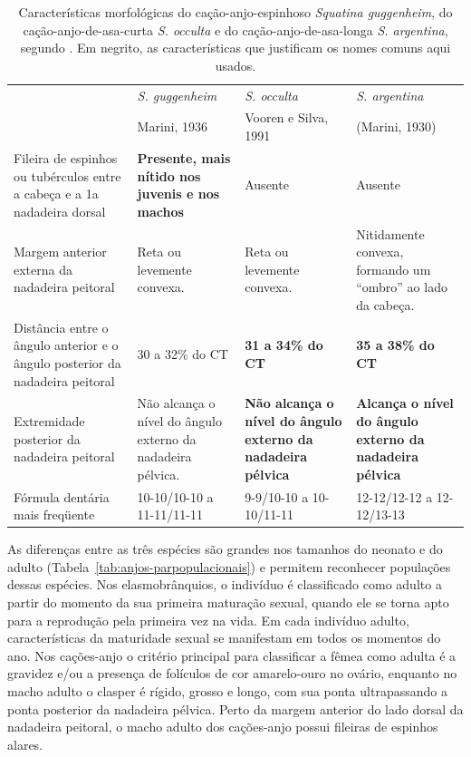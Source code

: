 \documentclass[a4paper,11pt,twoside,showtrims,onecolumn,openright,final]{memoir}
\begin{document}
\begin{table}
\caption[Características morfológicas dos cações-anjo \emph{Squatina guggenheim}, 
	 \emph{S. occulta} e \emph{S. argentina}]
        {Características morfológicas do cação-anjo-espinhoso \emph{Squatina guggenheim}, 
	 do cação-anjo-de-asa-curta \emph{S. occulta} e do 
	 cação-anjo-de-asa-longa \emph{S. argentina}, segundo \citet{vooren1991}. 
	 Em negrito, as características que justificam os nomes comuns aqui usados. }
\label{tab:anjos-morfologia}
\begin{small}
\begin{tabularx}{\textwidth}{XXXX}
\toprule
					& \emph{S. guggenheim} & \emph{S. occulta} & \emph{S. argentina} \\ 
					& Marini, 1936		     & Vooren e Silva, 1991    & (Marini, 1930) \\
\midrule
\addlinespace
Fileira de espinhos ou tubérculos 
entre a cabeça e a 1a nadadeira dorsal
					& \textbf{Presente, mais nítido 
					nos juvenis e nos 
					machos}			& Ausente		& Ausente \\
\midrule
\addlinespace
Margem anterior externa da 
nadadeira peitoral			& Reta ou levemente 
					convexa.		& Reta ou levemente 
								convexa.		& Nitidamente convexa, 
											formando um ``ombro'' 
											ao lado da cabeça.  \\
\midrule
\addlinespace
Distância entre o ângulo anterior 
e o ângulo posterior da 
nadadeira peitoral 			& 30 a 32\% do CT	& \textbf{31 a 34\% do CT}	& \textbf{35 a 38\% do CT} \\
\midrule
\addlinespace
Extremidade posterior da nadadeira 
peitoral				& Não alcança o nível 
					do ângulo externo da 
					nadadeira pélvica.	& \textbf{Não alcança o nível 
								do ângulo externo da 
								nadadeira pélvica}	& \textbf{Alcança o nível do 
											ângulo externo da 
											nadadeira pélvica} \\
\midrule
\addlinespace
Fórmula dentária mais freqüente		& 10-10/10-10 a 
					11-11/11-11		& 9-9/10-10 a 
								10-10/11-11		& 12-12/12-12 a 
											12-12/13-13 \\
\bottomrule
\end{tabularx}
\end{small}
\end{table}


As diferenças entre as três espécies são grandes nos tamanhos do neonato e do adulto (Tabela~\ref{tab:anjos-parpopulacionais}) %
e permitem reconhecer populações dessas espécies. Nos elasmobrânquios, o indivíduo é classificado 
como adulto a partir do momento da sua primeira maturação sexual, quando ele se torna apto para 
a reprodução pela primeira vez na vida. Em cada indivíduo adulto, características da maturidade 
sexual se manifestam em todos os momentos do ano. Nos cações-anjo o critério principal para 
classificar a fêmea como adulta é a gravidez e/ou a presença de folículos de cor amarelo-ouro 
no ovário, enquanto no macho adulto o clasper é rígido, grosso e longo, com sua ponta ultrapassando 
a ponta posterior da nadadeira pélvica. Perto da margem anterior do lado dorsal da nadadeira peitoral, 
o macho adulto dos cações-anjo possui fileiras de espinhos alares.
\end{document}
